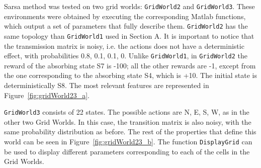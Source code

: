 \documentclass[10pt]{article}   	%
\begin{document}
Sarsa method was tested on two grid worlds: \texttt{GridWorld2} and \texttt{GridWorld3}. These environments were obtained by executing the corresponding Matlab functions, which output a set of parameters that fully describe them. \texttt{GridWorld2} has the same topology than \texttt{GridWorld1} used in Section A. It is important to notice that the transmission matrix is noisy, i.e. the actions does not have a deterministic effect, with probabilities {0.8,  0.1, 0.1, 0}. Unlike \texttt{GridWorld1}, in \texttt{GridWorld2} the reward of the absorbing state S7 is -100; all the other rewards are -1, except from the one corresponding to the absorbing state S4, which is +10. The initial state is deterministically S8. The most relevant features are represented in Figure~\ref{fig:gridWorld23_a}.

\texttt{GridWorld3} consists of 22 states. The possible actions are {N, E, S, W}, as in the other two Grid Worlds. In this case, the transition matrix is also noisy, with the same probability distribution as before. The rest of the properties that define this world can be seen in Figure~\ref{fig:gridWorld23_b}. The function \texttt{DisplayGrid} can be used to display different parameters corresponding to each of the cells in the Grid Worlds.
\end{document}
